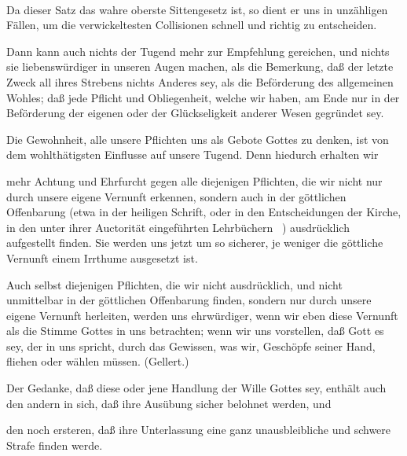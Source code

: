 \begin{aufza}
\item {}~\par
\begin{aufzb}
\item Da dieser Satz das wahre oberste Sittengesetz ist, so dient er uns in unzähligen Fällen, um die verwickeltesten Collisionen schnell und richtig zu entscheiden.
\item Dann kann auch nichts der Tugend mehr zur Empfehlung gereichen, und nichts sie liebenswürdiger in unseren Augen machen, als die Bemerkung, daß der letzte Zweck all ihres Strebens nichts Anderes sey, als die Beförderung des allgemeinen Wohles; daß jede Pflicht und Obliegenheit, welche wir haben, am Ende nur in der Beförderung der eigenen oder der Glückseligkeit anderer Wesen gegründet sey.
\end{aufzb}
\item {}\par
Die Gewohnheit, alle unsere Pflichten uns als Gebote Gottes zu denken, ist von dem wohlthätigsten Einflusse auf unsere Tugend. Denn hiedurch erhalten wir
\begin{aufzb}
\item mehr Achtung und Ehrfurcht gegen alle diejenigen Pflichten, die wir nicht nur durch unsere eigene Vernunft erkennen, sondern auch in der göttlichen Offenbarung (etwa in der heiligen Schrift, oder in den Entscheidungen der Kirche, in den unter ihrer Auctorität eingeführten Lehrbüchern \udgl\ ) ausdrücklich aufgestellt finden. Sie werden uns jetzt um so sicherer, je weniger die göttliche Vernunft einem Irrthume ausgesetzt ist.
\item Auch selbst diejenigen Pflichten, die wir nicht ausdrücklich, und nicht unmittelbar in der göttlichen Offenbarung finden, sondern nur durch unsere eigene Vernunft herleiten, werden uns ehrwürdiger, wenn wir eben diese Vernunft als die Stimme Gottes in uns betrachten; wenn wir uns vorstellen, daß Gott es sey, der in uns spricht, durch das Gewissen, was wir, Geschöpfe seiner Hand, fliehen oder wählen müssen. (Gellert.)
\item Der Gedanke, daß diese oder jene Handlung der Wille Gottes sey, enthält auch den andern in sich, daß ihre Ausübung sicher belohnet werden, und
\item den noch ersteren, daß ihre Unterlassung eine ganz unausbleibliche und schwere Strafe finden werde.

\end{aufzb}
\end{aufza}
